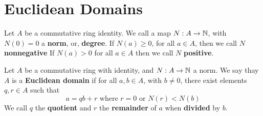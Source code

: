 \section{Euclidean Domains}

\begin{definition}
    Let $A$ be a commutative ring identity. We call a map  $N:A \xrightarrow{} \mathbb{N}$,
    with $N(0)=0$ a \textbf{norm}, or, \textbf{degree}. If $N(a) \geq 0$, for all
    $a \in A$, then we call $N$ \textbf{nonnegative} If $N(a)>0$ for all $a \in A$
    then we call  $N$ \textbf{positive}.
\end{definition}

\begin{definition}
    Let $A$ be a commutative ring with identity, and  $N:A \xrightarrow{} \mathbb{N}$ a
    norm. We say thay $A$ is a \textbf{Euclidean domain} if for all $a,b \in A$,
    with $b \neq 0$, there exist elements  $q,r \in A$ such that
    \begin{equation*}
        a=qb+r \text{ where } r=0 \text{ or } N(r)<N(b)
    \end{equation*}
    We call $q$ the  \textbf{quotient} and $r$ the  \textbf{remainder} of $a$
    when  \textbf{divided} by $b$.
\end{definition}

